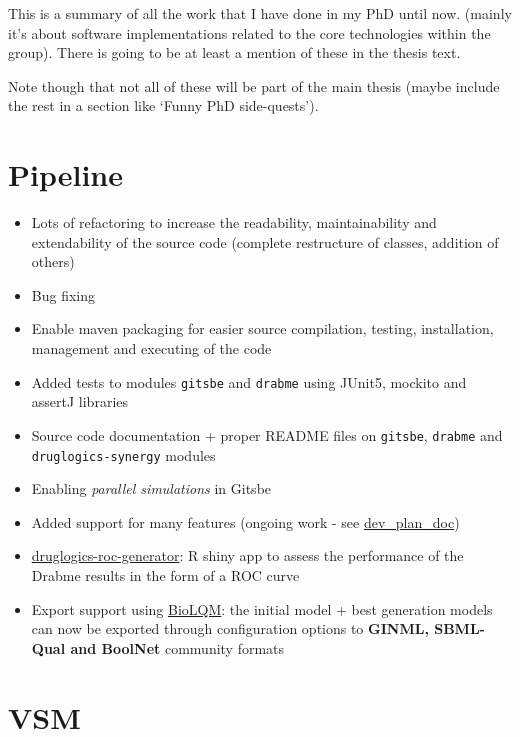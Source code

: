 \documentclass[12pt,]{book}
\providecommand{\tightlist}{%
  \setlength{\itemsep}{0pt}\setlength{\parskip}{0pt}}
\begin{document}
This is a summary of all the work that I have done in my PhD until now.
(mainly it's about software implementations related to the core technologies
within the group). There is going to be at least a mention of these in the
thesis text.

Note though that not all of these will be part of the main thesis (maybe include the
rest in a section like `Funny PhD side-quests').

\hypertarget{pipeline}{%
\section{Pipeline}\label{pipeline}}

\begin{itemize}
\tightlist
\item
  Lots of refactoring to increase the readability, maintainability and
  extendability of the source code (complete restructure of classes, addition of
  others)
\item
  Bug fixing
\item
  Enable maven packaging for easier source compilation, testing,
  installation, management and executing of the code
\item
  Added tests to modules \texttt{gitsbe} and \texttt{drabme} using JUnit5, mockito and assertJ libraries
\item
  Source code documentation + proper README files on \texttt{gitsbe}, \texttt{drabme} and \texttt{druglogics-synergy} modules
\item
  Enabling \emph{parallel simulations} in Gitsbe
\item
  Added support for many features (ongoing work - see \href{https://docs.google.com/document/d/1OUupR0b-28YB9pVAww77RMecnFN6A39MYjXMjljmvG4/edit?usp=sharing}{dev\_plan\_doc})
\item
  \href{https://github.com/bblodfon/druglogics-roc-generator}{druglogics-roc-generator}:
  R shiny app to assess the performance of the Drabme results in the form of a
  ROC curve
\item
  Export support using \href{https://github.com/colomoto/bioLQM}{BioLQM}: the
  initial model + best generation models can now be exported through configuration
  options to \textbf{GINML, SBML-Qual and BoolNet} community formats
\end{itemize}

\hypertarget{vsm}{%
\section{VSM}\label{vsm}}
\end{document}
